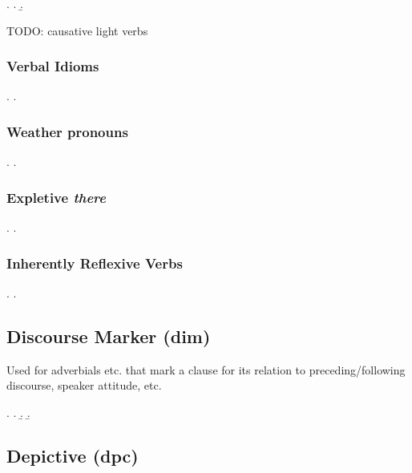 \documentclass[a4paper]{article}
\begin{document}
\ex.
\a. 
\b. 

TODO: causative light verbs

\subsubsection{Verbal Idioms}

\ex.
\a. 

\subsubsection{Weather pronouns}

\ex.
\a. 

\subsubsection{Expletive \emph{there}}

\ex.
\a. 

\subsubsection{Inherently Reflexive Verbs}

\ex.
\a. 



\clearpage
\subsection{Discourse Marker (\textsf{dim})}
\label{sec:dim}

Used for adverbials etc. that mark a clause for its relation to preceding/following discourse, speaker attitude, etc.

\ex.
\a. 
\b. 
\b. 


\clearpage
\subsection{Depictive (\textsf{dpc})}
\label{sec:dpc}
\end{document}
